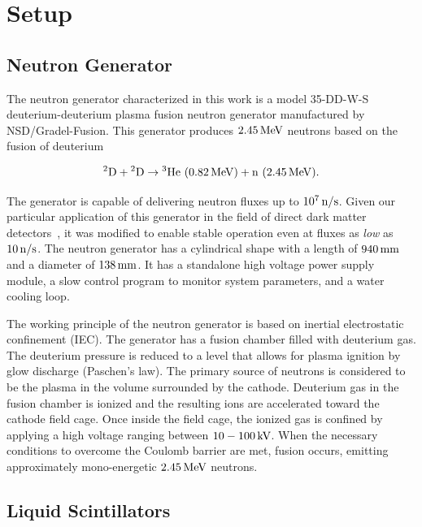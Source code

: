 \section{Setup} \label{sec:ng_setup}

\subsection{Neutron Generator}

The neutron generator characterized in this work is a model 35-DD-W-S deuterium-deuterium plasma fusion neutron generator manufactured by NSD/Gradel-Fusion. This generator produces $2.45\,\mathrm{MeV}$ neutrons based on the fusion of deuterium

\begin{equation}
\rm{{}^2D + {}^2D } \rightarrow \rm{{}^3He~}(0.82\,\mathrm{MeV}) + \rm{n~} (2.45\,\mathrm{MeV}) {\rm .} \label{eqn:main_reaction}
\end{equation}

The generator is capable of delivering neutron fluxes up to $10^7\,\mathrm{n/s}$. Given our particular application of this generator in the field of direct dark matter detectors~\cite{Aprile:2015uzo}, it was modified to enable stable operation even at fluxes as \textit{low} as $10\,\mathrm{n/s}$. The neutron generator has a cylindrical shape with a length of $940\,\mathrm{mm}$ and a diameter of $138\,\mathrm{mm}$. It has a standalone high voltage power supply module, a slow control program to monitor system parameters, and a water cooling loop.

The working principle of the neutron generator is based on inertial electrostatic confinement (IEC). The generator has a fusion chamber filled with deuterium gas. The deuterium pressure is reduced to a level that allows for plasma ignition by glow discharge (Paschen's law). The primary source of neutrons is considered to be the plasma in the volume surrounded by the cathode. Deuterium gas in the fusion chamber is ionized and the resulting ions are accelerated toward the cathode field cage. Once inside the field cage, the ionized gas is confined by applying a high voltage ranging between $10-100\,\mathrm{kV}$. When the necessary conditions to overcome the Coulomb barrier are met, fusion occurs, emitting approximately mono-energetic $2.45\,\mathrm{MeV}$ neutrons.

\subsection{Liquid Scintillators}

